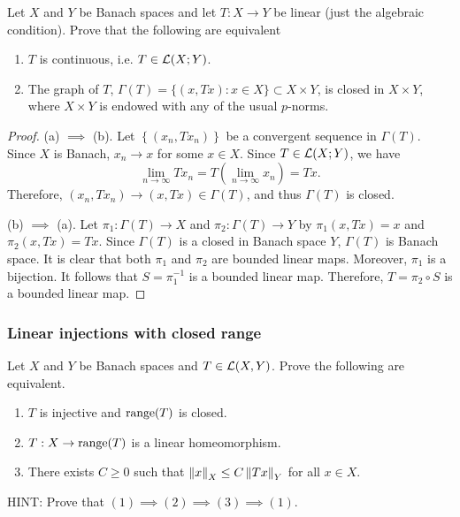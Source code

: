 \documentclass[a4paper]{article}
\begin{document}
\begin{thm}
    Let $X$ and $Y$ be Banach spaces and let $T : X \to Y$
    be linear (just the algebraic condition).
    Prove that the following are equivalent
\end{thm}
\begin{enumerate}
\item $T$ is continuous, i.e. $T \in \mathcal{L}(X;Y)$.
\item The graph of $T$, $\Gamma(T) = \{(x,Tx) : x \in X\}
\subset X \times Y$, is closed in $X \times Y$, where
$X \times Y$ is endowed with any of the usual $p$-norms.
\end{enumerate}

\begin{proof}
  (a) $\implies$ (b). Let $\left\{ (x_n, T x_n) \right\}$ be a convergent sequence
  in $\Gamma(T)$. Since $X$ is Banach, $x_n \to x$ for some $x \in X$.
  Since $T \in \mathcal{L}(X ; Y)$, we have
  \[
  \lim_{n \to \infty} T x_n = T \left( \lim_{n \to \infty} x_n \right) = T x.
  \]
  Therefore, $(x_n, T x_n) \to (x, T x) \in \Gamma(T)$, and thus
  $\Gamma(T)$ is closed.

  (b) $\implies$ (a). Let $\pi_1 : \Gamma(T) \to X$ and
  $\pi_2 : \Gamma(T) \to Y$ by
  $\pi_1 (x, T x) = x$ and $\pi_2 (x, T x) = Tx$. Since
  $\Gamma(T)$ is a closed in Banach space $Y$,
  $\Gamma(T)$ is Banach space. It is clear that both $\pi_1$
  and $\pi_2$ are bounded linear maps. Moreover, $\pi_1$ is a
  bijection. It follows that $S = \pi_1^{-1}$ is a bounded linear
  map. Therefore, $T = \pi_2 \circ S$ is a bounded linear map.

\end{proof}

\subsubsection*{Linear injections with closed range}
\begin{thm}
    Let $X$ and $Y$ be Banach spaces and $T \in \mathcal{L}(X,Y)$.
    Prove the following are equivalent.
\begin{enumerate}
 \item $T$ is injective and $\operatorname{range}(T)$ is closed.
 \item $T : X \to \operatorname{range}(T)$ is a linear homeomorphism.
 \item There exists $C\ge 0$ such that $\left\lVert x\right\rVert_X \leq C
 \left\lVert Tx\right\rVert_Y$ for all $x \in X$.
\end{enumerate}
HINT: Prove that $(1) \implies (2) \implies (3) \implies
(1)$.
\end{thm}
\end{document}
